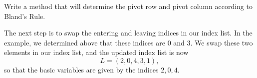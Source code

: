 \begin{problem}
Write a method that will determine the pivot row and pivot column according to Bland's Rule.

\label{prob:blands}
\end{problem}

The next step is to swap the entering and leaving indices in our index list.
In the example, we determined above that these indices are $0$ and $3$. We swap these two elements in our index list,
and the updated index list is now
\[
L = (2, 0, 4, 3, 1),
\]
so that the basic variables are given by the indices $2, 0, 4$. 

